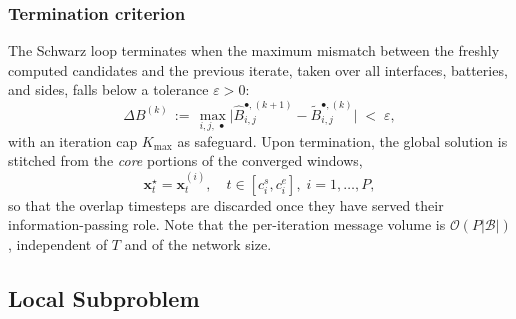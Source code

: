 \subsubsection*{Termination criterion}
The Schwarz loop terminates when the maximum mismatch between the
freshly computed candidates and the previous iterate, taken over all
interfaces, batteries, and sides, falls below a tolerance
$\varepsilon\!>\!0$:
\begin{equation}
\label{eq:term}
\Delta B^{(k)} \,:=\, \max_{i,j,\,\bullet}
\big|\widehat{B}^{\bullet,(k+1)}_{i,j} - \widetilde{B}^{\bullet,(k)}_{i,j}\big|
\;<\; \varepsilon,
\end{equation}
with an iteration cap $K_{\max}$ as safeguard. Upon termination, the
global solution is stitched from the \emph{core} portions of the
converged windows,
\begin{equation}
\label{eq:stitch}
\bm{x}^{\star}_{t} = \bm{x}^{(i)}_{t},
\quad t\!\in\![c^{s}_{i},c^{e}_{i}],\; i=1,\dots,P,
\end{equation}
so that the overlap timesteps are discarded once they have served their
information-passing role. Note that the per-iteration message volume
is $\mathcal{O}(P|\mathcal{B}|)$, independent of $T$ and of the network
size.

\subsection{Local Subproblem}
\label{sec:otd_obj}

